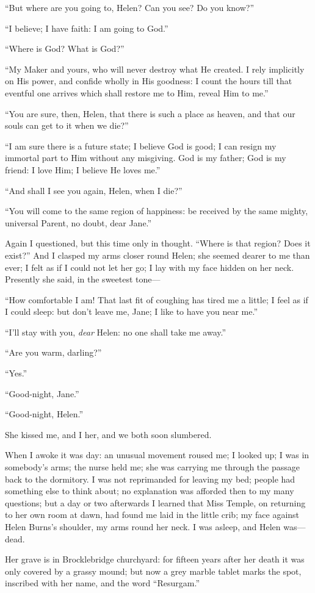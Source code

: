 \enquote{But where are you going to, Helen? Can you see? Do you know?}

\enquote{I believe; I have faith: I am going to God.}

\enquote{Where is God? What is God?}

\enquote{My Maker and yours, who will never destroy what He created. I
rely implicitly on His power, and confide wholly in His goodness: I
count the hours till that eventful one arrives which shall restore me to
Him, reveal Him to me.}

\enquote{You are sure, then, Helen, that there is such a place as
heaven, and that our souls can get to it when we die?}

\enquote{I am sure there is a future state; I believe God is good; I can
resign my immortal part to Him without any misgiving. God is my father;
God is my friend: I love Him; I believe He loves me.}

\enquote{And shall I see you again, Helen, when I die?}

\enquote{You will come to the same region of happiness: be received by
the same mighty, universal Parent, no doubt, dear Jane.}

Again I questioned, but this time only in thought. \enquote{Where is
that region? Does it exist?} And I clasped my arms closer round Helen;
she seemed dearer to me than ever; I felt as if I could not let her go;
I lay with my face hidden on her neck. Presently she said, in the
sweetest tone---

\enquote{How comfortable I am! That last fit of coughing has tired me a
little; I feel as if I could sleep: but don't leave me, Jane; I like to
have you near me.}

\enquote{I'll stay with you, \emph{dear} Helen: no one shall take me away.}

\enquote{Are you warm, darling?}

\enquote{Yes.}

\enquote{Good-night, Jane.}

\enquote{Good-night, Helen.}

She kissed me, and I her, and we both soon slumbered.

When I awoke it was day: an unusual movement roused me; I looked up; I
was in somebody's arms; the nurse held me; she was carrying me through
the passage back to the dormitory. I was not reprimanded for leaving my
bed; people had something else to think about; no explanation was
afforded then to my many questions; but a day or two afterwards I
learned that Miss Temple, on returning to her own room at dawn, had
found me laid in the little crib; my face against Helen Burns's
shoulder, my arms round her neck. I was asleep, and Helen was---dead.

Her grave is in Brocklebridge churchyard: for fifteen years after her
death it was only covered by a grassy mound; but now a grey marble
tablet marks the spot, inscribed with her name, and the word
\enquote{Resurgam.}
